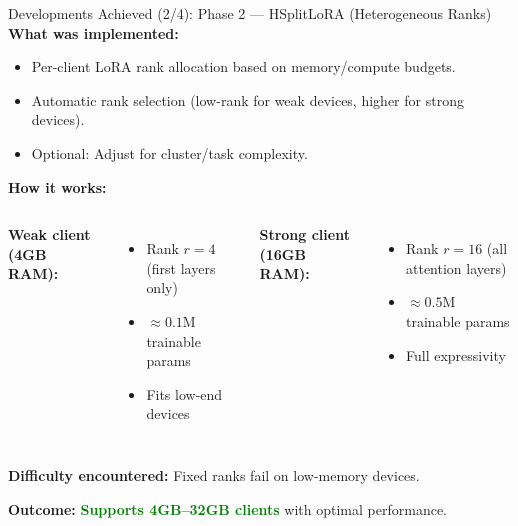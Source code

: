 \documentclass[aspectratio=169]{beamer}
\begin{document}
\begin{frame}{Developments Achieved (2/4): Phase 2 --- HSplitLoRA (Heterogeneous Ranks)}
\textbf{What was implemented:}
\begin{itemize}
  \item Per-client LoRA rank allocation based on memory/compute budgets.
  \item Automatic rank selection (low-rank for weak devices, higher for strong devices).
  \item Optional: Adjust for cluster/task complexity.
\end{itemize}

\vspace{0.3cm}
\textbf{How it works:}
\begin{columns}[T]
\textbf{Weak client (4GB RAM):}
\begin{itemize}
  \item Rank $r=4$ (first layers only)
  \item $\approx 0.1$M trainable params
  \item Fits low-end devices
\end{itemize}

\textbf{Strong client (16GB RAM):}
\begin{itemize}
  \item Rank $r=16$ (all attention layers)
  \item $\approx 0.5$M trainable params
  \item Full expressivity
\end{itemize}
\end{columns}

\vspace{0.3cm}
\textbf{Difficulty encountered:} Fixed ranks fail on low-memory devices.

\textbf{Outcome:} \textcolor{green}{\textbf{Supports 4GB–32GB clients}} with optimal performance.
\end{frame}
\end{document}
